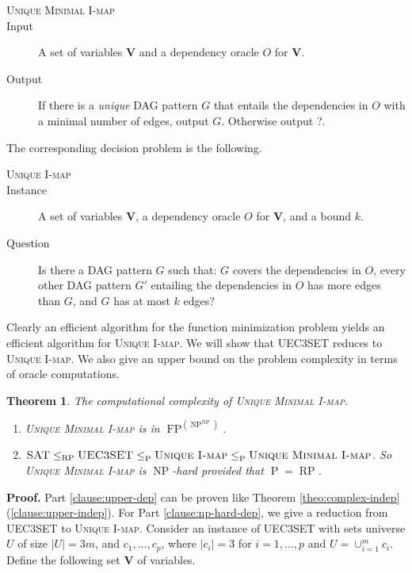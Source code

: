 \documentclass{elsarticle}%
\newtheorem{theorem}{Theorem}
\DeclareMathOperator{\Poly}{\mathbf{\mathrm{P}}}
\DeclareMathOperator{\RP}{\mathbf{\mathrm{RP}}}
\DeclareMathOperator{\FP}{\mathbf{\mathrm{FP}}}
\DeclareMathOperator{\NP}{\mathbf{\mathrm{NP}}}
\newcommand{\V}{\mathbf{V}}
\begin{document}
\begin{description}
\item[\textsc{Unique Minimal I-map}]
\item[Input] A set of variables \textbf{V } and a dependency oracle $O$
for \textbf{V}.
\item[Output] If there is a \emph{unique} DAG pattern $G$ that entails the
dependencies in $O$ with a minimal number of edges, output $G$. Otherwise
output ?.
\end{description}
 The corresponding decision problem is the following.%
\begin{description}
\item[\textsc{Unique I-map} ]
\item[Instance] A set of variables \textbf{V}, a dependency oracle $O$
for \textbf{V}, and a bound $k$.
\item[Question] Is there a DAG pattern $G$ such that: $G$ covers the
  dependencies in $O$, every other DAG pattern $G'$
  entailing the dependencies in
  $O$ has more edges than $G$,
  and $G$ has at most $k$ edges?
\end{description}
Clearly an efficient algorithm for the function minimization problem yields an
efficient algorithm for \textsc{Unique I-map}. We will
show that \textsc{UEC3SET} reduces to \textsc{Unique I-map}. We also give an upper bound on the problem complexity in terms of oracle computations.

\begin{theorem} The computational complexity of \textsc{Unique Minimal
I-map}. 
\begin{enumerate}
\item \textsc{Unique Minimal
I-map} is in $\FP^{(\NP^{\NP})}$. \label{clause:upper-dep}
\item $\textsc{SAT} \leq_{\RP} \textsc{UEC3SET} \leq_{\Poly} \textsc{Unique I-map} \leq_{\Poly} \textsc{Unique Minimal I-map}$. So \textsc{Unique Minimal
I-map} is $\NP$-hard provided that $\Poly=\RP$. \label{clause:np-hard-dep}
\end{enumerate}
\end{theorem}

\textbf{Proof.} Part \ref{clause:upper-dep} can be proven like Theorem \ref{theo:complex-indep}(\ref{clause:upper-indep}). 
For Part \ref{clause:np-hard-dep}, we give a reduction from \textsc{UEC3SET} to \textsc{Unique I-map}. Consider an instance of \textsc{UEC3SET} with sets
universe $U$ of size $|U|=3m$, and $c_{1},\ldots,c_{p}$, where $|c_{i}|=3$ for
$i=1,\ldots,p$ and $U=\cup_{i=1}^{m}c_{i}$. Define the following set $\V$ of variables.
\end{document}
